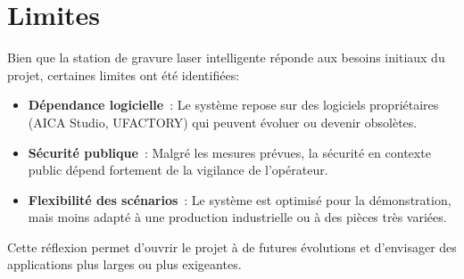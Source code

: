 \section{Limites}
Bien que la station de gravure laser intelligente réponde aux besoins initiaux du projet, certaines limites ont été identifiées:
\begin{itemize}
    \item \textbf{Dépendance logicielle} : Le système repose sur des logiciels propriétaires (AICA Studio, UFACTORY) qui peuvent évoluer ou devenir obsolètes.
    \item \textbf{Sécurité publique} : Malgré les mesures prévues, la sécurité en contexte public dépend fortement de la vigilance de l'opérateur.
    \item \textbf{Flexibilité des scénarios} : Le système est optimisé pour la démonstration, mais moins adapté à une production industrielle ou à des pièces très variées.
\end{itemize}

Cette réflexion permet d'ouvrir le projet à de futures évolutions et d'envisager des applications plus larges ou plus exigeantes.



